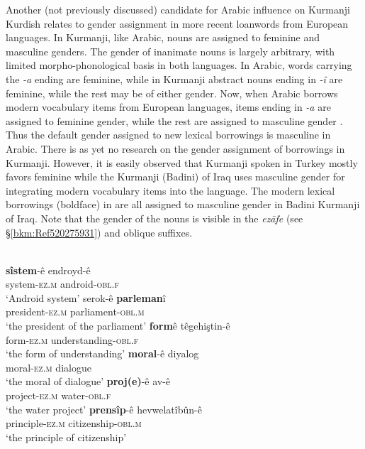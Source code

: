 \documentclass[output=paper]{langsci/langscibook}
\begin{document}
Another (not previously discussed) candidate for Arabic influence on Kurmanji Kurdish relates to gender assignment in more recent loanwords from European languages. In Kurmanji, like Arabic, nouns are assigned to feminine and masculine genders. The gender of inanimate nouns is largely arbitrary, with limited morpho-phonological basis in both languages. In Arabic, words carrying the \textit{{}-a} ending are feminine, while in Kurmanji abstract nouns ending in \textit{-î} are feminine, while the rest may be of either gender. Now, when Arabic borrows modern vocabulary items from European languages, items ending in \textit{{}-a} are assigned to feminine gender, while the rest are assigned to masculine gender \citep[5]{Ibrahim2015}. Thus the default gender assigned to new lexical borrowings is masculine in Arabic. There is as yet no research on the gender assignment of borrowings in Kurmanji. However, it is easily observed that Kurmanji spoken in Turkey mostly favors feminine while the Kurmanji (Badini) of Iraq uses masculine gender for integrating modern vocabulary items into the language. The modern lexical borrowings (boldface) in  are all assigned to masculine gender in Badini Kurmanji of Iraq. Note that the gender of the nouns is visible in the \textit{ezāfe} (see §\ref{bkm:Ref520275931}) and oblique suffixes. 

{}\label{bkm:Ref14712415}\\
\ea 
\gll \textbf{sîstem}-ê endroyd-ê\\
     system-\textsc{ez.m} android-\textsc{obl.f}\\
\glt ‘Android system’
\ex\label{parl}
\gll serok-ê \textbf{parleman}î\\
     president-\textsc{ez.m} parliament-\textsc{obl.m}\\
\glt ‘the president of the parliament’
\ex \gll \textbf{form}ê têgehiştin-ê\\
     form-\textsc{ez.m} understanding\textsc{{}-obl.f}\\
\glt ‘the form of understanding’
\ex \gll \textbf{moral}-ê diyalog\\
     moral-\textsc{ez.m} dialogue\\
\glt ‘the moral of dialogue’
\ex \gll \textbf{proj(e)}-ê av-ê\\
     project-\textsc{ez.m} water-\textsc{obl.f}\\
\glt ‘the water project’
\ex
\gll \textbf{prensîp}-ê hevwelatîbûn-ê\\
     principle-\textsc{ez.m} citizenship-\textsc{obl.m}\\
\glt ‘the principle of citizenship’
\z
\z
\end{document}
